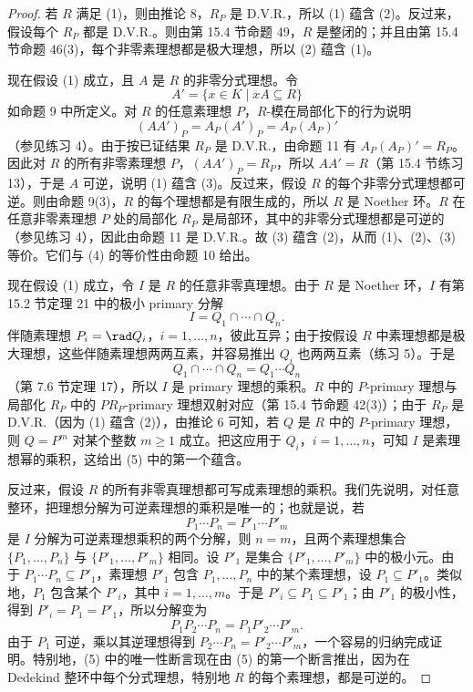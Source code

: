 \begin{proof}
若 $R$ 满足 (1)，则由推论 8，$R_P$ 是 D.V.R.，所以 (1) 蕴含 (2)。反过来，假设每个 $R_P$ 都是 D.V.R.。则由第 15.4 节命题 49，$R$ 是整闭的；并且由第 15.4 节命题 46(3)，每个非零素理想都是极大理想，所以 (2) 蕴含 (1)。

现在假设 (1) 成立，且 $A$ 是 $R$ 的非零分式理想。令
\[
  A'=\{x\in K\mid xA\subseteq R\}
\]
如命题 9 中所定义。对 $R$ 的任意素理想 $P$，$R$-模在局部化下的行为说明
\[
  (AA')_P=A_P(A')_P=A_P(A_P)'
\]
（参见练习 4）。由于按已证结果 $R_P$ 是 D.V.R.，由命题 11 有 $A_P(A_P)'=R_P$。因此对 $R$ 的所有非零素理想 $P$，$(AA')_P=R_P$，所以 $AA'=R$（第 15.4 节练习 13），于是 $A$ 可逆，说明 (1) 蕴含 (3)。反过来，假设 $R$ 的每个非零分式理想都可逆。则由命题 9(3)，$R$ 的每个理想都是有限生成的，所以 $R$ 是 Noether 环。$R$ 在任意非零素理想 $P$ 处的局部化 $R_P$ 是局部环，其中的非零分式理想都是可逆的（参见练习 4），因此由命题 11 是 D.V.R.。故 (3) 蕴含 (2)，从而 (1)、(2)、(3) 等价。它们与 (4) 的等价性由命题 10 给出。

现在假设 (1) 成立，令 $I$ 是 $R$ 的任意非零真理想。由于 $R$ 是 Noether 环，$I$ 有第 15.2 节定理 21 中的极小 primary 分解
\[
  I=Q_1\cap\cdots\cap Q_n.
\]
伴随素理想 $P_i=\rad Q_i$，$i=1,
\ldots,n$，彼此互异；由于按假设 $R$ 中素理想都是极大理想，这些伴随素理想两两互素，并容易推出 $Q_i$ 也两两互素（练习 5）。于是
\[
  Q_1\cap\cdots\cap Q_n=Q_1\cdots Q_n
\]
（第 7.6 节定理 17），所以 $I$ 是 primary 理想的乘积。$R$ 中的 $P$-primary 理想与局部化 $R_P$ 中的 $PR_P$-primary 理想双射对应（第 15.4 节命题 42(3)）；由于 $R_P$ 是 D.V.R.（因为 (1) 蕴含 (2)），由推论 6 可知，若 $Q$ 是 $R$ 中的 $P$-primary 理想，则 $Q=P^m$ 对某个整数 $m\geq1$ 成立。把这应用于 $Q_i$，$i=1,
\ldots,n$，可知 $I$ 是素理想幂的乘积，这给出 (5) 中的第一个蕴含。

反过来，假设 $R$ 的所有非零真理想都可写成素理想的乘积。我们先说明，对任意整环，把理想分解为可逆素理想的乘积是唯一的；也就是说，若
\[
  P_1\cdots P_n=P'_1\cdots P'_m
\]
是 $I$ 分解为可逆素理想乘积的两个分解，则 $n=m$，且两个素理想集合 $\{P_1,
\ldots,P_n\}$ 与 $\{P'_1,
\ldots,P'_m\}$ 相同。设 $P'_1$ 是集合 $\{P'_1,
\ldots,P'_m\}$ 中的极小元。由于 $P_1\cdots P_n\subseteq P'_1$，素理想 $P'_1$ 包含 $P_1,
\ldots,P_n$ 中的某个素理想，设 $P_1\subseteq P'_1$。类似地，$P_1$ 包含某个 $P'_i$，其中 $i=1,
\ldots,m$。于是 $P'_i\subseteq P_1\subseteq P'_1$；由 $P'_1$ 的极小性，得到 $P'_i=P_1=P'_1$，所以分解变为
\[
  P_1P_2\cdots P_n=P_1P'_2\cdots P'_m.
\]
由于 $P_1$ 可逆，乘以其逆理想得到 $P_2\cdots P_n=P'_2\cdots P'_m$，一个容易的归纳完成证明。特别地，(5) 中的唯一性断言现在由 (5) 的第一个断言推出，因为在 Dedekind 整环中每个分式理想，特别地 $R$ 的每个素理想，都是可逆的。


\end{proof}
